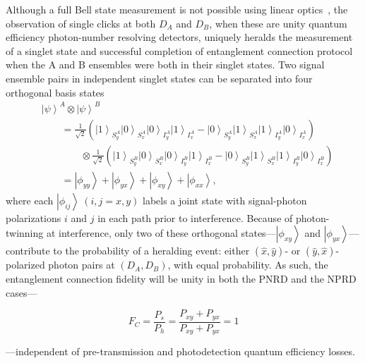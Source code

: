 \documentclass[aps,twocolumn,secnumarabic,amsmath,amssymb,pra,groupedaddress,
showpacs, showkeys]{revtex4-1}
\newcommand{\ket}[1]{\left|#1\right\rangle}
\newcommand{\pna}[1]{\left(#1\right)}
\newcommand{\eqn}[1]{
\begin{equation}
	#1
\end{equation}
}
\begin{document}
Although a full Bell state measurement is not possible using linear
optics~\cite{PhysRevA.59.3295}, the observation of single clicks at both $D_A$
and $D_B$, when these are unity quantum efficiency photon-number resolving
detectors, uniquely heralds the measurement of a singlet state and successful
completion of entanglement connection protocol when the A and B ensembles were
both in their singlet states. Two signal ensemble pairs in independent singlet
states can be separated into four orthogonal basis states
\begin{align}
& \ket{\psi}^A \otimes \ket{\psi}^B \nonumber \\ 
& \qquad =
\frac{1}{\sqrt{2}}\pna{\ket{1}_{S_y^A}\ket{0}_{S_x^A}\ket{0}_{I_y^A}\ket{1}_{I_x^A}-\ket{0}_{S_y^A}\ket{1}_{S_x^A}\ket{1}_{I_y^A}\ket{0}_{I_x^A}}\nonumber
\\ 
& \qquad \qquad \otimes \frac{1}{\sqrt{2}}\pna{\ket{1}_{S_y^B}\ket{0}_{S_x^B}\ket{0}_{I_y^B}\ket{1}_{I_x^B}-\ket{0}_{S_y^B}\ket{1}_{S_x^B}\ket{1}_{I_y^B}\ket{0}_{I_x^B}} \nonumber \\
& \qquad = \ket{\phi_{yy}}+\ket{\phi_{yx}}+\ket{\phi_{xy}}+\ket{\phi_{xx}},
\end{align}
where each $\ket{\phi_{ij}}~\pna{i,j=x,y}$ labels a joint state with
signal-photon polarizations $i$ and $j$ in each path prior to interference.
Because of photon-twinning at interference, only two of these orthogonal
states---$\ket{\phi_{xy}}$ and $\ket{\phi_{yx}}$---contribute to the
probability of a heralding event: either $\pna{\hat{x},\hat{y}}$- or
$\pna{\hat{y},\hat{x}}$-polarized photon pairs at $\pna{D_A,D_B}$, with equal
probability.  As such, the entanglement connection fidelity will be unity in
both the PNRD and the NPRD cases---
\eqn{
F_C = \frac{P_{s}}{P_{h}} = \frac{P_{xy}+P_{yx}}{P_{xy}+P_{yx}}=1
}
---independent of pre-transmission and photodetection quantum efficiency losses. 
\end{document}
